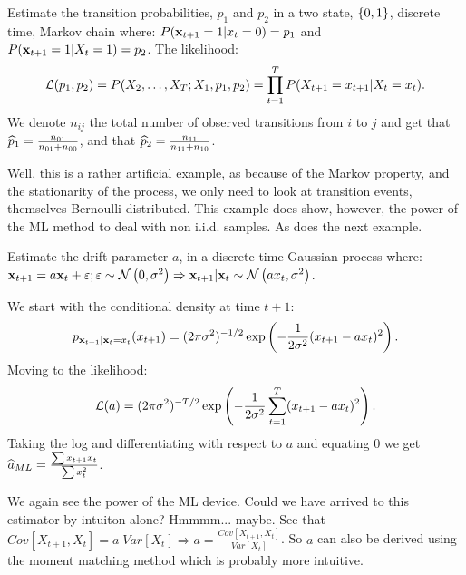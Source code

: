 \begin{example}

Estimate the transition probabilities,  $p_1$ and $p_2$ in a two state, $\left\{ 0,1 \right\}$, discrete time, Markov chain where:
$P(\mathbf{x}_{t+1}=1|x_{t}=0)=p_1$ and $P(\mathbf{x}_{t+1}=1|X_{t}=1)=p_2$.
The likelihood:
$$
  \mathcal{L}(p_1,p_2)=
  P(X_2,\dots,X_T;X_1,p_1,p_2)=
  \prod_{t=1}^T P(X_{t+1}=x_{t+1}|X_{t}=x_t).
$$
We denote $n_{ij}$ the total number of observed transitions from $i$ to $j$ and get that $\widehat{p}_1=\frac{n_{01}}{n_{01}+n_{00}}$, and that $\widehat{p}_2=\frac{n_{11}}{n_{11}+n_{10}}$.

\begin{remark}[Confession]
Well, this is a rather artificial example, as because of the Markov property, and the stationarity of the process, we only need to look at transition events, themselves Bernoulli distributed. 
This example does show, however, the power of the ML method to deal with non i.i.d. samples. As does the next example.
\end{remark}
\end{example}




\begin{example}
Estimate the drift parameter $a$,  in a discrete time Gaussian process where:
$\mathbf{x}_{t+1}=a \mathbf{x}_t+ \varepsilon; \varepsilon \sim \mathcal{N}\left(0,\sigma^2\right) \Rightarrow \mathbf{x}_{t+1}|\mathbf{x}_t \sim \mathcal{N}\left(a x_t,\sigma^2\right)$.

We start with the conditional density at time $t+1$:
$$
  p_{\mathbf{x}_{t+1}|\mathbf{x}_t=x_t}(x_{t+1}) = 
  (2 \pi \sigma^2)^{-1/2} \exp \left( 
    -\frac{1}{2 \sigma^2}(x_{t+1}-a x_t)^2 
  \right).
$$
Moving to the likelihood:
$$
  \mathcal{L}(a) = 
  (2 \pi \sigma^2)^{-T/2} \exp \left(
    -\frac{1}{2 \sigma^2}\sum_{t=1}^T (x_{t+1}-a x_t)^2 
  \right).
$$
Taking the log and differentiating with respect to $a$ and equating $0$ we get $\widehat{a}_{ML}=\frac{\sum x_{t+1}x_{t}}{\sum x_t^2}$.

We again see the power of the ML device.
Could we have arrived to this estimator by intuiton alone? Hmmmm... maybe. 
See that $Cov[X_{t+1},X_t] = a \; Var[X_t] \Rightarrow a=\frac{Cov[X_{t+1},X_t]}{Var[X_t]}$.
So $a$ can also be derived using the moment matching method which is probably more intuitive.

\end{example}




